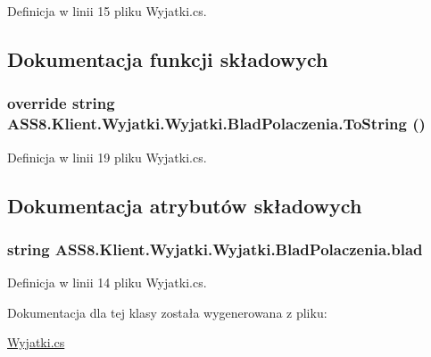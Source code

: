 Definicja w linii 15 pliku Wyjatki.cs.

\subsection{Dokumentacja funkcji składowych}
\hypertarget{a00034_9b0fb66ce46934d7a501fb8f49969a92}{
\subsubsection[{ToString}]{\setlength{\rightskip}{0pt plus 5cm}override string ASS8.Klient.Wyjatki.Wyjatki.BladPolaczenia.ToString ()}}
\label{db/df3/a00034_9b0fb66ce46934d7a501fb8f49969a92}




Definicja w linii 19 pliku Wyjatki.cs.

\subsection{Dokumentacja atrybutów składowych}
\hypertarget{a00034_f32d7702691c3151506e46e516d471b9}{
\subsubsection[{blad}]{\setlength{\rightskip}{0pt plus 5cm}string ASS8.Klient.Wyjatki.Wyjatki.BladPolaczenia.blad}}
\label{db/df3/a00034_f32d7702691c3151506e46e516d471b9}




Definicja w linii 14 pliku Wyjatki.cs.

Dokumentacja dla tej klasy została wygenerowana z pliku:\begin{CompactItemize}
\item 
\hyperlink{a00053}{Wyjatki.cs}\end{CompactItemize}
